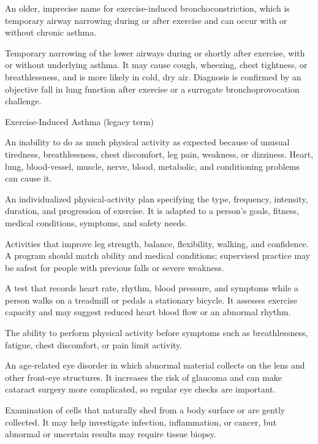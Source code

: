  An older, imprecise name for exercise-induced bronchoconstriction, which is temporary airway narrowing during or after exercise and can occur with or without chronic asthma.

 Temporary narrowing of the lower airways during or shortly after exercise, with or without underlying asthma.
It may cause cough, wheezing, chest tightness, or breathlessness, and is more likely in cold, dry air.
Diagnosis is confirmed by an objective fall in lung function after exercise or a surrogate bronchoprovocation challenge.

\synonyms
Exercise-Induced Asthma (legacy term)

 An inability to do as much physical activity as expected because of unusual tiredness, breathlessness, chest discomfort, leg pain, weakness, or dizziness. Heart, lung, blood-vessel, muscle, nerve, blood, metabolic, and conditioning problems can cause it.

 An individualized physical-activity plan specifying the type, frequency, intensity, duration, and progression of exercise. It is adapted to a person's goals, fitness, medical conditions, symptoms, and safety needs.

 Activities that improve leg strength, balance, flexibility, walking, and confidence. A program should match ability and medical conditions; supervised practice may be safest for people with previous falls or severe weakness.

 A test that records heart rate, rhythm, blood pressure, and symptoms while a person walks on a treadmill or pedals a stationary bicycle. It assesses exercise capacity and may suggest reduced heart blood flow or an abnormal rhythm.

 The ability to perform physical activity before symptoms such as breathlessness, fatigue, chest discomfort, or pain limit activity.

 An age-related eye disorder in which abnormal material collects on the lens and other front-eye structures. It increases the risk of glaucoma and can make cataract surgery more complicated, so regular eye checks are important.

 Examination of cells that naturally shed from a body surface or are gently collected. It may help investigate infection, inflammation, or cancer, but abnormal or uncertain results may require tissue biopsy.

